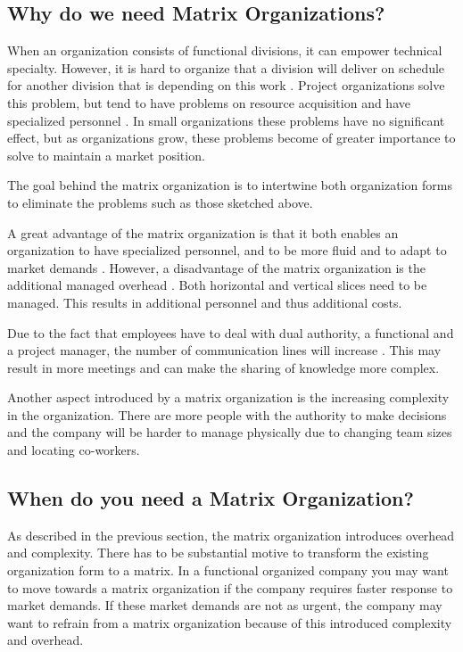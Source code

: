 \subsection*{Why do we need Matrix Organizations?}
When an organization consists of functional divisions, it can empower technical specialty. However, it is hard to organize that a division will deliver on schedule for another division that is depending on this work \autocite[30]{Galbraith197129}.
Project organizations solve this problem, but tend to have problems on resource acquisition and have specialized personnel \autocite[30]{Galbraith197129}.
In small organizations these problems have no significant effect, but as organizations grow, these problems become of greater importance to solve to maintain a market position.

The goal behind the matrix organization is to intertwine both organization forms to eliminate the problems such as those sketched above.

A great advantage of the matrix organization is that it both enables an organization to have specialized personnel, and to be more fluid and to adapt to market demands \autocite[31]{Galbraith197129}.
However, a disadvantage of the matrix organization is the additional managed overhead \autocite[34]{Galbraith197129}. Both horizontal and vertical slices need to be managed. This results in additional personnel and thus additional costs.

Due to the fact that employees have to deal with dual authority, a functional and a project manager, the number of communication lines will increase \autocite[38]{Galbraith197129}. This may result in more meetings and can make the sharing of knowledge more complex.

Another aspect introduced by a matrix organization is the increasing complexity in the organization.  There are more people with the authority to make decisions and the company will be harder to manage physically \autocite[39]{Galbraith197129} due to changing team sizes and locating co-workers.

\subsection*{When do you need a Matrix Organization?}
As described in the previous section, the matrix organization introduces overhead and complexity. There has to be substantial motive to transform the existing organization form to a matrix.
In a functional organized company you may want to move towards a matrix organization if the company requires faster response to market demands. If these market demands are not as urgent, the company may want to refrain from a matrix organization because of this introduced complexity and overhead.

